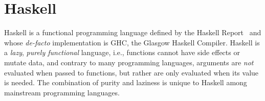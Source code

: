 \documentclass[]{lwnovathesis}
\newcommand{\mypara}[1]{\paragraph{\textbf{#1}.}}
\newcommand{\lolli}{\multimap}
\newcommand{\bang}{{!}}
\newcommand{\llet}[2]{\mathsf{let}~#1~\mathsf{in}~#2}
\begin{document}










\section{Haskell}

Haskell is a functional programming language defined by the Haskell
Report~\cite{jones1999haskell,marlow2010haskell} and whose \emph{de-facto}
implementation is GHC, the Glasgow Haskell Compiler\cite{GHC}. Haskell is a
\emph{lazy}, \emph{purely functional} language, i.e., functions cannot
have side effects or mutate data, and contrary to many programming languages,
arguments are \emph{not} evaluated when passed to functions, but rather are only
evaluated when its value is needed. The combination of purity and laziness is
unique to Haskell among mainstream programming languages.
\end{document}

